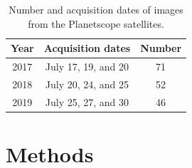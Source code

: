 \documentclass[authoryear,preprint,review,12pt]{elsarticle}
\begin{document}


\begin{table}[ht]
\footnotesize
\caption{Number and acquisition dates of images from the Planetscope satellites.}
\label{table_image_list}
\centering
\begin{tabular}{c  c    c  }	%
\toprule

Year & Acquisition dates & Number  \\
\midrule
2017  & July 17, 19, and 20  & 71 \\
2018  & July 20, 24, and 25  & 52 \\
2019   & July 25, 27, and 30 & 46 \\

\bottomrule
\end{tabular}

\end{table}


\section{Methods}
\label{sec_meth}
\end{document}
